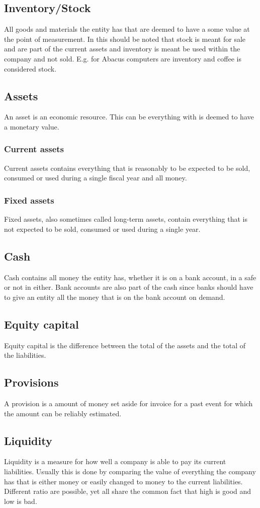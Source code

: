 \documentclass{report}
\begin{document}
\subsection{Inventory/Stock}
All goods and materials the entity has that are deemed to have a some value at the point of measurement. In this should be noted that stock is meant for sale and are part of the current assets and inventory is meant be used within the company and not sold. E.g. for Abacus computers are inventory and coffee is considered stock. 
\subsection{Assets}
An asset is an economic resource. This can be everything with is deemed to have a monetary value. 
\subsubsection{Current assets}
Current assets contains everything that is reasonably to be expected to be sold, consumed or used during a single fiscal year and all money.   
\subsubsection{Fixed assets}
Fixed assets, also sometimes called long-term assets, contain everything that is not expected to be sold, consumed or used during a single year. 
\subsection{Cash}
Cash contains all money the entity has, whether it is on a bank account, in a safe or not in either. Bank accounts are also part of the cash since banks should have to give an entity all the money that is on the bank account on demand. 
\subsection{Equity capital}
Equity capital is the difference between the total of the assets and the total of the liabilities.
\subsection{Provisions}
A provision is a amount of money set aside for invoice for a past event for which the amount can be reliably estimated.
\subsection{Liquidity}
Liquidity is a measure for how well a company is able to pay its current liabilities. Usually this is done by comparing the value of everything the company has that is either money or easily changed to money to the current liabilities. Different ratio are possible, yet all share the common fact that high is good and low is bad.
\end{document}

